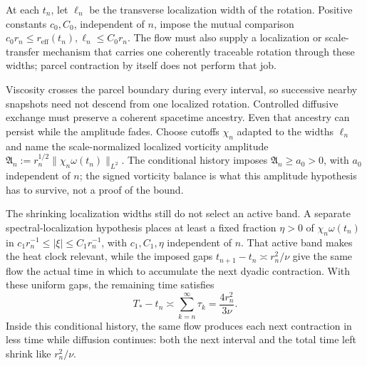 At each \(t_n\), let \(\ell_n\) be the transverse localization width of the rotation. Positive constants \(c_0,C_0\), independent of \(n\), impose the mutual comparison \(c_0 r_n\leq r_{\mathrm{eff}}(t_n),\ell_n\leq C_0r_n\). The flow must also supply a localization or scale-transfer mechanism that carries one coherently traceable rotation through these widths; parcel contraction by itself does not perform that job.

Viscosity crosses the parcel boundary during every interval, so successive nearby snapshots need not descend from one localized rotation. Controlled diffusive exchange must preserve a coherent spacetime ancestry. Even that ancestry can persist while the amplitude fades. Choose cutoffs \(\chi_n\) adapted to the widths \(\ell_n\) and name the scale-normalized localized vorticity amplitude \(\mathfrak A_n:=r_n^{1/2}\|\chi_n\omega(t_n)\|_{L^2}\). The conditional history imposes \(\mathfrak A_n\geq a_0>0\), with \(a_0\) independent of \(n\); the signed vorticity balance is what this amplitude hypothesis has to survive, not a proof of the bound.

The shrinking localization widths still do not select an active band. A separate spectral-localization hypothesis places at least a fixed fraction \(\eta>0\) of \(\chi_n\omega(t_n)\) in \(c_1r_n^{-1}\leq|\xi|\leq C_1r_n^{-1}\), with \(c_1,C_1,\eta\) independent of \(n\). That active band makes the heat clock relevant, while the imposed gaps \(t_{n+1}-t_n\asymp r_n^2/\nu\) give the same flow the actual time in which to accumulate the next dyadic contraction. With these uniform gaps, the remaining time satisfies
\[
  T_*-t_n
  \asymp
  \sum_{k=n}^{\infty}\tau_k
  =
  \frac{4r_n^2}{3\nu}.
\]
Inside this conditional history, the same flow produces each next contraction in less time while diffusion continues: both the next interval and the total time left shrink like \(r_n^2/\nu\).
